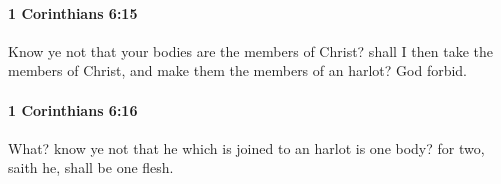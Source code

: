 		\paragraph{1 Corinthians 6:15} %
			\label{1CORINTHIANS-6-15}

			Know ye not that your bodies are the members of Christ? shall I then take the members of Christ, and make them the members of an harlot? God forbid.

			\begin{framed}
			\scriptsize
				\begin{compactdesc}
					\item[SBLG] 
				\end{compactdesc}
			\end{framed}

		\paragraph{1 Corinthians 6:16} %
			\label{1CORINTHIANS-6-16}

			What? know ye not that he which is joined to an harlot is one body? for two, saith he, shall be one flesh.

